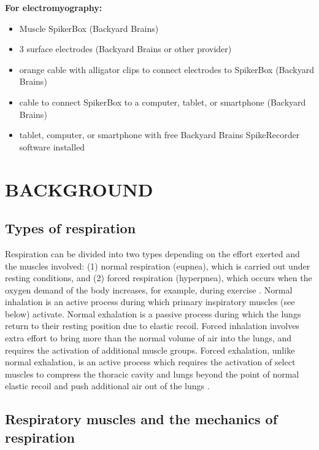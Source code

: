 \documentclass[12pt]{article}
\begin{document}
\vspace{0.3cm}

\textbf{For electromyography:}
 \begin{itemize}
	\item Muscle SpikerBox (Backyard Brains)
    \item 3 surface electrodes (Backyard Brains or other provider)
    \item orange cable with alligator clips to connect electrodes to SpikerBox (Backyard Brains)
    \item cable to connect SpikerBox to a computer, tablet, or smartphone (Backyard Brains)
 	\item tablet, computer, or smartphone with free Backyard Brains SpikeRecorder software installed
\end{itemize}


\section*{BACKGROUND}

\subsection*{Types of respiration}

Respiration can be divided into two types depending on the effort exerted and the muscles involved: (1) normal respiration (eupnea), which is carried out under resting conditions, and (2) forced respiration (hyperpnea), which occurs when the oxygen demand of the body increases, for example, during exercise \cite{openStax2016resp}. Normal inhalation is an active process during which primary inspiratory muscles (see below) activate. Normal exhalation is a passive process during which the lungs return to their resting position due to elastic recoil. Forced inhalation involves extra effort to bring more than the normal volume of air into the lungs, and requires the activation of additional muscle groups. Forced exhalation, unlike normal exhalation, is an active process which requires the activation of select muscles to compress the thoracic cavity and lungs beyond the point of normal elastic recoil and push additional air out of the lungs \cite{openStax2016resp}.

\subsection*{Respiratory muscles and the mechanics of respiration}
\end{document}
